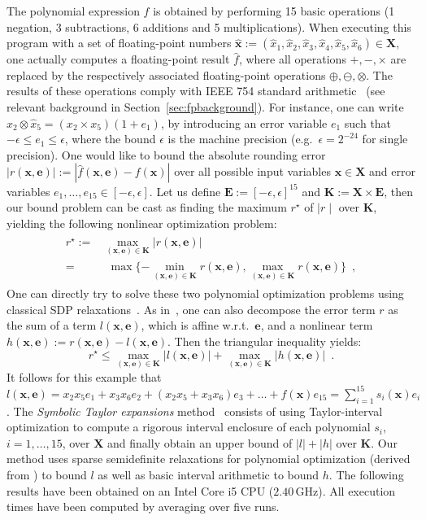 \documentclass[preprint]{sigplanconf}
\newcommand{\x}{\mathbf{x}}
\newcommand{\e}{\mathbf{e}}
\def\E{\mathbf{E}}
\def\K{\mathbf{K}}
\def\X{\mathbf{X}}
\theoremstyle{plain}
\begin{document}
The polynomial expression $f$ is obtained by performing 15 basic operations (1 negation, 3 subtractions, 6 additions and 5 multiplications). 
When executing this program with a set of floating-point numbers $\hat{\x} :=  (\hat{x}_1, \hat{x}_2, \hat{x}_3, \hat{x}_4, \hat{x}_5, \hat{x}_6) \in \X$, one actually computes a floating-point result $\hat{f}$, where all operations $+, -, \times$ are replaced by the respectively associated floating-point operations $\oplus, \ominus, \otimes$. 
The results of these operations comply with IEEE 754 standard arithmetic~\cite{IEEE} (see relevant background in Section~\ref{sec:fpbackground}). For instance, one can write $\hat{x}_2 \otimes \hat{x}_5 =  (x_2 \times x_5) (1 + e_1)$, by introducing an error variable $e_1$ such that $-\epsilon \leq e_1 \leq \epsilon$, where the bound $\epsilon$ is the machine precision (e.g.~$\epsilon = 2^{-24}$ for single precision). One would like to bound the absolute rounding error $|r(\x, \e)| := | \hat{f}(\x, \e) - f (\x) |$ over  all possible input variables $\x \in \X$ and error variables $e_1, \dots, e_{15} \in [-\epsilon, \epsilon]$. Let us define $\E := [-\epsilon, \epsilon]^{15}$ and $\K := \X \times \E$, then our bound problem can be cast as finding the maximum $r^\star$ of $\mid r \mid$ over $\K$, yielding the following nonlinear optimization problem:
%
\begin{align}
\begin{split}
\label{eq:roptim}
r^\star := & \max_{(\x, \e) \in \K} | r(\x, \e) | \\
 = & \ \ \max \{-\min_{(\x, \e) \in \K} r(\x, \e), \max_{(\x, \e) \in \K} r(\x,\e)\} \enspace,
\end{split}
\end{align}
%
One can directly try to solve these two polynomial optimization problems using classical SDP relaxations~\cite{Lasserre01moments}.
As in~\cite{fptaylor15}, one can also decompose the error term $r$ as the sum of a term $l(\x,\e)$, which is affine w.r.t.~$\e$, and a nonlinear term $h(\x,\e) := r(\x,\e) - l(\x,\e)$. Then the triangular inequality yields:
%
\begin{equation}
\label{eq:lhoptim} 
r^\star \leq \max_{(\x, \e) \in \K} |l(\x, \e)| + \max_{(\x, \e) \in \K} |h(\x, \e)| \enspace. 
\end{equation}
%
It follows for this example that $l(\x,\e) = x_2 x_5 e_1 + x_3 x_6 e_2 +  (x_2 x_5 + x_3 x_6) e_3 + \dots + f(\x) e_{15} = \sum_{i=1}^{15} s_i(\x) e_i$. The {\em Symbolic Taylor expansions} method~\cite{fptaylor15} consists of using Taylor-interval optimization to compute a rigorous interval enclosure of each polynomial $s_i$, $i = 1,\dots,15$, over $\X$ and finally obtain an upper bound of $|l| + |h|$ over $\K$. Our method uses sparse semidefinite relaxations for polynomial optimization (derived from \cite{Las06SparseSOS}) to bound $l$ as well as basic interval arithmetic to bound $h$. The following results have been obtained on an Intel Core i5 CPU ($2.40\, $GHz). All execution times have been computed by averaging over five runs.
\end{document}
